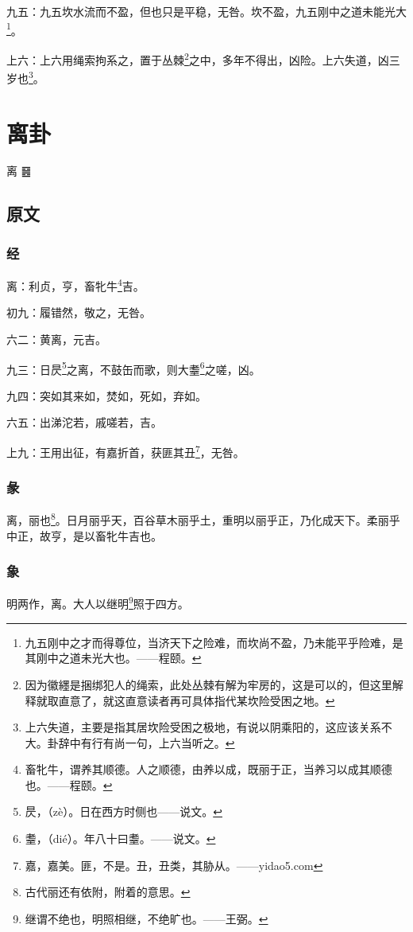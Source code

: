 \documentclass[12pt,oneside]{book}
\begin{document}
九五：九五坎水流而不盈，但也只是平稳，无咎。坎不盈，九五刚中之道未能光大\footnote{九五刚中之才而得尊位，当济天下之险难，而坎尚不盈，乃未能平乎险难，是其刚中之道未光大也。——程颐。}。

上六：上六用绳索拘系之，置于丛棘\footnote{因为徽纆是捆绑犯人的绳索，此处丛棘有解为牢房的，这是可以的，但这里解释就取直意了，就这直意读者再可具体指代某坎险受困之地。}之中，多年不得出，凶险。上六失道，凶三岁也\footnote{上六失道，主要是指其居坎险受困之极地，有说以阴乘阳的，这应该关系不大。卦辞中有行有尚一句，上六当听之。}。


\chapter{离卦}
离 {\Large ䷝}

\section{原文}


\subsection{经}
离：利贞，亨，畜牝牛\footnote{畜牝牛，谓养其顺德。人之顺德，由养以成，既丽于正，当养习以成其顺德也。——程颐。}吉。

初九：履错然，敬之，无咎。

六二：黄离，元吉。

九三：日昃\footnote{昃，（zè）。日在西方时侧也——说文。}之离，不鼓缶而歌，则大耋\footnote{耋，（dié）。年八十曰耋。——说文。}之嗟，凶。

九四：突如其来如，焚如，死如，弃如。

六五：出涕沱若，戚嗟若，吉。

上九：王用出征，有嘉折首，获匪其丑\footnote{嘉，嘉美。匪，不是。丑，丑类，其胁从。——yidao5.com}，无咎。

\subsection{彖}
离，丽也\footnote{古代丽还有依附，附着的意思。}。日月丽乎天，百谷草木丽乎土，重明以丽乎正，乃化成天下。柔丽乎中正，故亨，是以畜牝牛吉也。

\subsection{象}
明两作，离。大人以继明\footnote{继谓不绝也，明照相继，不绝旷也。——王弼。}照于四方。
\end{document}
